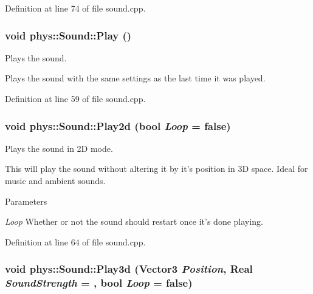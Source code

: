 Definition at line 74 of file sound.cpp.

\hypertarget{classphys_1_1Sound_ae7caa90deb9e5a4cab2d5ada27f5e5b5}{
\subsubsection[{Play}]{\setlength{\rightskip}{0pt plus 5cm}void phys::Sound::Play ()}}
\label{dc/d2f/classphys_1_1Sound_ae7caa90deb9e5a4cab2d5ada27f5e5b5}


Plays the sound. 

Plays the sound with the same settings as the last time it was played. 

Definition at line 59 of file sound.cpp.

\hypertarget{classphys_1_1Sound_a853bb9a2c1b41cd82a385608614861e7}{
\subsubsection[{Play2d}]{\setlength{\rightskip}{0pt plus 5cm}void phys::Sound::Play2d (bool {\em Loop} = {\ttfamily false})}}
\label{dc/d2f/classphys_1_1Sound_a853bb9a2c1b41cd82a385608614861e7}


Plays the sound in 2D mode. 

This will play the sound without altering it by it's position in 3D space. Ideal for music and ambient sounds. 
\begin{DoxyParams}{Parameters}
\item[{\em Loop}]Whether or not the sound should restart once it's done playing. \end{DoxyParams}


Definition at line 64 of file sound.cpp.

\hypertarget{classphys_1_1Sound_adbb79c9d1a37bf541bfb259551c6067f}{
\subsubsection[{Play3d}]{\setlength{\rightskip}{0pt plus 5cm}void phys::Sound::Play3d ({\bf Vector3} {\em Position}, \/  {\bf Real} {\em SoundStrength} = {}, \/  bool {\em Loop} = {\ttfamily false})}}
\label{dc/d2f/classphys_1_1Sound_adbb79c9d1a37bf541bfb259551c6067f}


